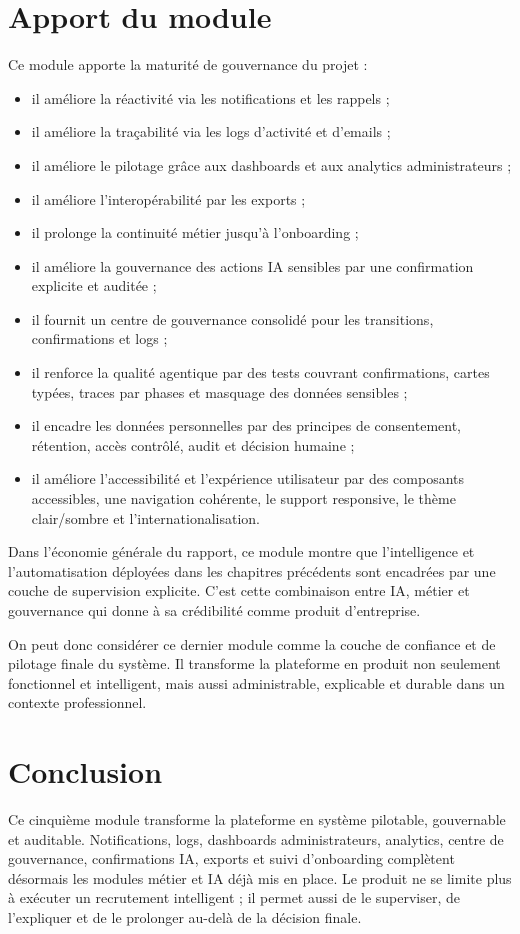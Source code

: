 \section{Apport du module}
Ce module apporte la maturité de gouvernance du projet :
\begin{itemize}
  \item il améliore la réactivité via les notifications et les rappels ;
  \item il améliore la traçabilité via les logs d'activité et d'emails ;
  \item il améliore le pilotage grâce aux dashboards et aux analytics administrateurs ;
  \item il améliore l'interopérabilité par les exports ;
  \item il prolonge la continuité métier jusqu'à l'onboarding ;
  \item il améliore la gouvernance des actions IA sensibles par une confirmation explicite et auditée ;
  \item il fournit un centre de gouvernance consolidé pour les transitions, confirmations et logs ;
  \item il renforce la qualité agentique par des tests couvrant confirmations, cartes typées, traces par phases et masquage des données sensibles ;
  \item il encadre les données personnelles par des principes de consentement, rétention, accès contrôlé, audit et décision humaine ;
  \item il améliore l'accessibilité et l'expérience utilisateur par des composants accessibles, une navigation cohérente, le support responsive, le thème clair/sombre et l'internationalisation.
\end{itemize}

Dans l'économie générale du rapport, ce module montre que l'intelligence et l'automatisation déployées dans les chapitres précédents sont encadrées par une couche de supervision explicite. C'est cette combinaison entre IA, métier et gouvernance qui donne à \projectname{} sa crédibilité comme produit d'entreprise.

On peut donc considérer ce dernier module comme la couche de confiance et de pilotage finale du système. Il transforme la plateforme en produit non seulement fonctionnel et intelligent, mais aussi administrable, explicable et durable dans un contexte professionnel.

\section*{Conclusion}
Ce cinquième module transforme la plateforme en système pilotable, gouvernable et auditable. Notifications, logs, dashboards administrateurs, analytics, centre de gouvernance, confirmations IA, exports et suivi d'onboarding complètent désormais les modules métier et IA déjà mis en place. Le produit ne se limite plus à exécuter un recrutement intelligent ; il permet aussi de le superviser, de l'expliquer et de le prolonger au-delà de la décision finale.

